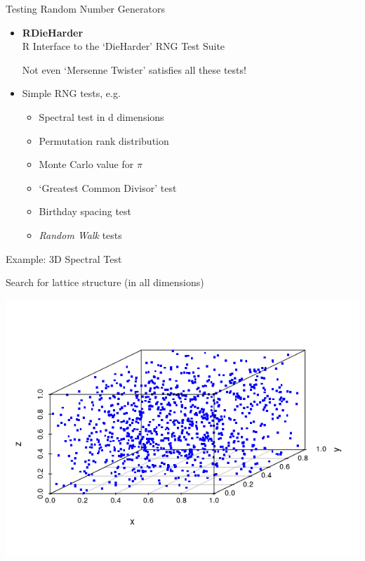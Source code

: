 \documentclass[ignorenonframetext,]{beamer}
\begin{document}
\begin{frame}{Testing Random Number Generators}
\protect\hypertarget{testing-random-number-generators}{}

\begin{itemize}
\item
  \textbf{RDieHarder}\\
  R Interface to the `DieHarder' RNG Test Suite

  Not even `Mersenne Twister' satisfies all these tests!
\item
  Simple RNG tests, e.g.

  \begin{itemize}
  \item
    Spectral test in d dimensions
  \item
    Permutation rank distribution
  \item
    Monte Carlo value for \(\pi\)
  \item
    `Greatest Common Divisor' test
  \item
    Birthday spacing test
  \item
    \emph{Random Walk} tests
  \end{itemize}
\end{itemize}

\end{frame}

\begin{frame}{Example: 3D Spectral Test}
\protect\hypertarget{example-3d-spectral-test}{}

Search for lattice structure (in all dimensions)

\includegraphics{test.png}

\end{frame}
\end{document}
